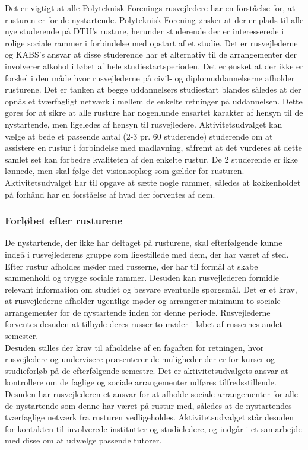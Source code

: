 Det er vigtigt at alle Polyteknisk Forenings rusvejledere har en forståelse for, at rusturen er for de nystartende. Polyteknisk Forening ønsker at der er plads til alle nye studerende på DTU’s rusture, herunder studerende der er interesserede i rolige sociale rammer i forbindelse med opstart af et studie. Det er rusvejlederne og KABS’s ansvar at disse studerende har et
alternativ til de arrangementer der involverer alkohol i løbet af hele studiestartsperioden. Det er ønsket at der ikke er forskel i den måde hvor rusvejlederne på civil- og diplomuddannelserne afholder rusturene. Det er tanken at begge uddannelsers studiestart blandes således at der opnås et tværfagligt netværk i mellem de enkelte retninger på uddannelsen. Dette gøres for at sikre at alle rusture har nogenlunde ensartet karakter af hensyn til de nystartende, men ligeledes af hensyn til rusvejledere. Aktivitetsudvalget kan vælge at bede et passende antal (2-3 pr. 60 studerende) studerende om at assistere en rustur i forbindelse med madlavning, såfremt at det vurderes at dette samlet set kan forbedre kvaliteten af den enkelte rustur. De 2 studerende er ikke lønnede, men skal følge det visionsoplæg som gælder for rusturen. Aktivitetsudvalget har til opgave at sætte nogle rammer, således at køkkenholdet på forhånd har en forståelse af hvad der forventes af dem.

\subsubsection{Forløbet efter rusturene}
De nystartende, der ikke har deltaget på rusturene, skal efterfølgende kunne indgå i rusvejlederens gruppe som ligestillede med dem, der har været af sted. Efter rustur afholdes møder med russerne, der har til formål at skabe sammenhold og trygge sociale rammer. Desuden kan rusvejlederen formidle relevant information om studiet og besvare eventuelle spørgsmål. Det er et krav, at rusvejlederne afholder ugentlige møder og arrangerer minimum to sociale arrangementer for de nystartende inden for denne periode. Rusvejlederne forventes desuden at tilbyde deres russer to møder i løbet af
russernes andet semester.\\

Desuden stilles der krav til afholdelse af en fagaften for retningen, hvor rusvejledere og undervisere præsenterer de
muligheder der er for kurser og studieforløb på de efterfølgende semestre. Det er aktivitetsudvalgets ansvar at kontrollere om de faglige og sociale arrangementer udføres tilfredsstillende. Desuden har rusvejlederen et ansvar for at afholde sociale arrangementer for alle de nystartende som denne har været på rustur med, således at de nystartendes tværfaglige netværk fra rusturen vedligeholdes. Aktivitetsudvalget står desuden for kontakten til involverede institutter og studieledere, og indgår i et samarbejde med disse om at udvælge passende tutorer.

